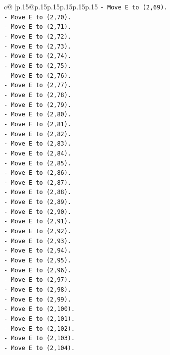 \documentclass{article}
\begin{document}
{\begin{supertabular}{c@{$\;$}|p{.15\linewidth}@{}p{.15\linewidth}p{.15\linewidth}p{.15\linewidth}p{.15\linewidth}p{.15\linewidth}}
{{{\texttt{{-} Move E to (2,69).} \\
\texttt{{-} Move E to (2,70).} \\
\texttt{{-} Move E to (2,71).} \\
\texttt{{-} Move E to (2,72).} \\
\texttt{{-} Move E to (2,73).} \\
\texttt{{-} Move E to (2,74).} \\
\texttt{{-} Move E to (2,75).} \\
\texttt{{-} Move E to (2,76).} \\
\texttt{{-} Move E to (2,77).} \\
\texttt{{-} Move E to (2,78).} \\
\texttt{{-} Move E to (2,79).} \\
\texttt{{-} Move E to (2,80).} \\
\texttt{{-} Move E to (2,81).} \\
\texttt{{-} Move E to (2,82).} \\
\texttt{{-} Move E to (2,83).} \\
\texttt{{-} Move E to (2,84).} \\
\texttt{{-} Move E to (2,85).} \\
\texttt{{-} Move E to (2,86).} \\
\texttt{{-} Move E to (2,87).} \\
\texttt{{-} Move E to (2,88).} \\
\texttt{{-} Move E to (2,89).} \\
\texttt{{-} Move E to (2,90).} \\
\texttt{{-} Move E to (2,91).} \\
\texttt{{-} Move E to (2,92).} \\
\texttt{{-} Move E to (2,93).} \\
\texttt{{-} Move E to (2,94).} \\
\texttt{{-} Move E to (2,95).} \\
\texttt{{-} Move E to (2,96).} \\
\texttt{{-} Move E to (2,97).} \\
\texttt{{-} Move E to (2,98).} \\
\texttt{{-} Move E to (2,99).} \\
\texttt{{-} Move E to (2,100).} \\
\texttt{{-} Move E to (2,101).} \\
\texttt{{-} Move E to (2,102).} \\
\texttt{{-} Move E to (2,103).} \\
\texttt{{-} Move E to (2,104).} \\
}}}
\end{supertabular}}
\end{document}
